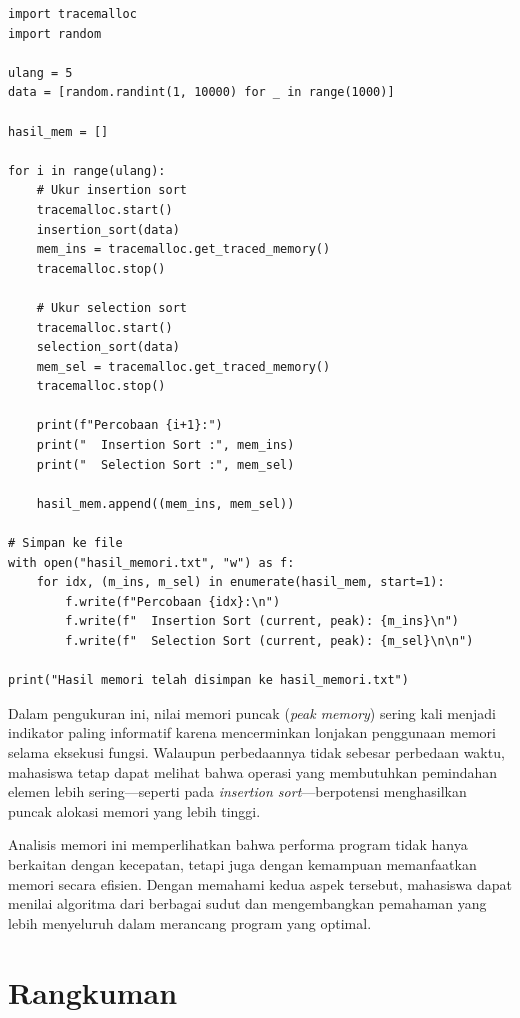 \begin{lstlisting}[style=PythonStyle, caption={Mengukur memori dua algoritma pengurutan}, label={lst:b14-mengukur-memori-dua-algoritma-pengurutan}]
import tracemalloc
import random

ulang = 5
data = [random.randint(1, 10000) for _ in range(1000)]

hasil_mem = []

for i in range(ulang):
    # Ukur insertion sort
    tracemalloc.start()
    insertion_sort(data)
    mem_ins = tracemalloc.get_traced_memory()
    tracemalloc.stop()

    # Ukur selection sort
    tracemalloc.start()
    selection_sort(data)
    mem_sel = tracemalloc.get_traced_memory()
    tracemalloc.stop()

    print(f"Percobaan {i+1}:")
    print("  Insertion Sort :", mem_ins)
    print("  Selection Sort :", mem_sel)

    hasil_mem.append((mem_ins, mem_sel))

# Simpan ke file
with open("hasil_memori.txt", "w") as f:
    for idx, (m_ins, m_sel) in enumerate(hasil_mem, start=1):
        f.write(f"Percobaan {idx}:\n")
        f.write(f"  Insertion Sort (current, peak): {m_ins}\n")
        f.write(f"  Selection Sort (current, peak): {m_sel}\n\n")

print("Hasil memori telah disimpan ke hasil_memori.txt")
\end{lstlisting}

Dalam pengukuran ini, nilai memori puncak (\textit{peak memory}) sering kali menjadi indikator paling informatif karena mencerminkan lonjakan penggunaan memori selama eksekusi fungsi. Walaupun perbedaannya tidak sebesar perbedaan waktu, mahasiswa tetap dapat melihat bahwa operasi yang membutuhkan pemindahan elemen lebih sering—seperti pada \textit{insertion sort}—berpotensi menghasilkan puncak alokasi memori yang lebih tinggi.

Analisis memori ini memperlihatkan bahwa performa program tidak hanya berkaitan dengan kecepatan, tetapi juga dengan kemampuan memanfaatkan memori secara efisien. Dengan memahami kedua aspek tersebut, mahasiswa dapat menilai algoritma dari berbagai sudut dan mengembangkan pemahaman yang lebih menyeluruh dalam merancang program yang optimal.



\section{Rangkuman}

